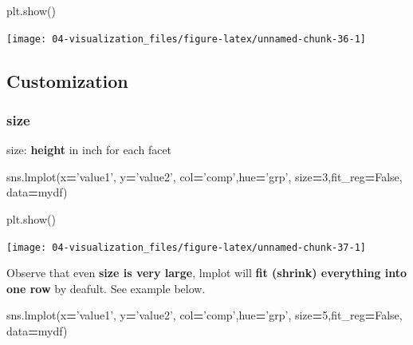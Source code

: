 \documentclass[
]{book}
\newenvironment{Shaded}{\begin{snugshade}}{\end{snugshade}}
\newcommand{\DecValTok}[1]{\textcolor[rgb]{0.06,0.06,0.06}{#1}}
\newcommand{\NormalTok}[1]{#1}
\newcommand{\OperatorTok}[1]{\textcolor[rgb]{0.43,0.43,0.43}{\textbf{#1}}}
\newcommand{\StringTok}[1]{\textcolor[rgb]{0.5,0.5,0.5}{#1}}
\newcommand{\VariableTok}[1]{\textcolor[rgb]{0,0,0}{#1}}
\begin{document}
\begin{Shaded}
\begin{Highlighting}[]
\NormalTok{plt.show()}
\end{Highlighting}
\end{Shaded}

\texttt{[image: 04-visualization\_files/figure-latex/unnamed-chunk-36-1]}

\hypertarget{customization}{%
\subsection{Customization}\label{customization}}

\hypertarget{size}{%
\subsubsection{size}\label{size}}

size: \textbf{height} in inch for each facet

\begin{Shaded}
\begin{Highlighting}[]
\NormalTok{sns.lmplot(x}\OperatorTok{=}\StringTok{'value1'}\NormalTok{, y}\OperatorTok{=}\StringTok{'value2'}\NormalTok{, col}\OperatorTok{=}\StringTok{'comp'}\NormalTok{,hue}\OperatorTok{=}\StringTok{'grp'}\NormalTok{, size}\OperatorTok{=}\DecValTok{3}\NormalTok{,fit_reg}\OperatorTok{=}\VariableTok{False}\NormalTok{, data}\OperatorTok{=}\NormalTok{mydf)}
\end{Highlighting}
\end{Shaded}

\begin{Shaded}
\begin{Highlighting}[]
\NormalTok{plt.show()}
\end{Highlighting}
\end{Shaded}

\texttt{[image: 04-visualization\_files/figure-latex/unnamed-chunk-37-1]}

Observe that even \textbf{size is very large}, lmplot will \textbf{fit (shrink) everything into one row} by deafult. See example below.

\begin{Shaded}
\begin{Highlighting}[]
\NormalTok{sns.lmplot(x}\OperatorTok{=}\StringTok{'value1'}\NormalTok{, y}\OperatorTok{=}\StringTok{'value2'}\NormalTok{, col}\OperatorTok{=}\StringTok{'comp'}\NormalTok{,hue}\OperatorTok{=}\StringTok{'grp'}\NormalTok{, size}\OperatorTok{=}\DecValTok{5}\NormalTok{,fit_reg}\OperatorTok{=}\VariableTok{False}\NormalTok{, data}\OperatorTok{=}\NormalTok{mydf)}
\end{Highlighting}
\end{Shaded}
\end{document}
